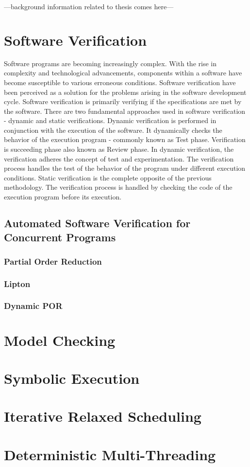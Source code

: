 ---background information related to thesis comes here---
\section{Software Verification}

Software programs are becoming increasingly complex. 
With the rise in complexity and technological advancements, components within a software have become susceptible to various erroneous conditions. 
Software verification have been perceived as a solution for the problems arising in the software development cycle. 
Software verification is primarily verifying if the specifications are met by the software. 
There are two fundamental approaches used in software verification - dynamic and static verifications. 
Dynamic verification is performed in conjunction with the execution of the software. 
It dynamically checks the behavior of the execution program - commonly known as Test phase. 
Verification is succeeding phase also known as Review phase. 
In dynamic verification, the verification adheres the concept of test and experimentation. 
The verification process handles the test of the behavior of the program under different execution conditions. 
Static verification is the complete opposite of the previous methodology. 
The verification process is handled by checking the code of the execution program before its execution. 




\subsection{Automated Software Verification for Concurrent Programs}
\subsubsection{Partial Order Reduction}
\subsubsection{Lipton}
\subsubsection{Dynamic POR}

\section{Model Checking}
\section{Symbolic Execution}

\section{Iterative Relaxed Scheduling}
\section{Deterministic Multi-Threading}
